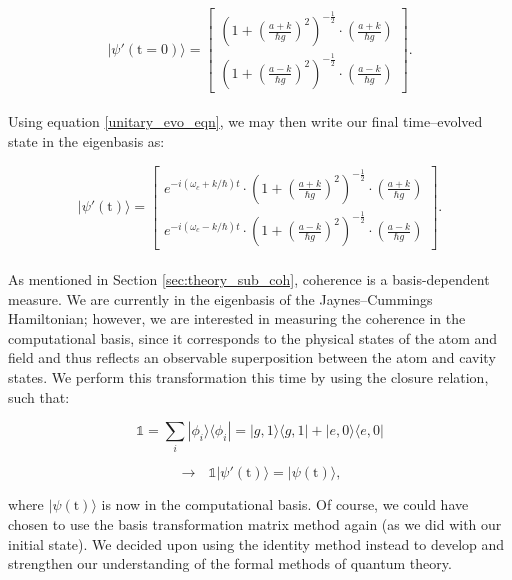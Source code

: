 \documentclass[11pt]{article}
\begin{document}
\begin{equation*}
    |\psi'(\text{t} = 0)\rangle = 
    \begin{bmatrix}
        \left(1 + \left(\frac{a + k}{\hbar g}\right)^2\right)^{-\frac{1}{2}}\cdot\left(\frac{a + k}{\hbar g}\right) \\
        \left(1 + \left(\frac{a - k}{\hbar g}\right)^2\right)^{-\frac{1}{2}}\cdot\left(\frac{a - k}{\hbar g}\right)
    \end{bmatrix}.
\end{equation*}
\\
Using equation \eqref{unitary_evo_eqn}, we may then write our final time--evolved state in the eigenbasis as:

\begin{equation*}
    |\psi'(\text{t})\rangle = 
    \begin{bmatrix}
        e^{-i(\omega_c + k/\hbar)t}\cdot\left(1 + \left(\frac{a + k}{\hbar g}\right)^2\right)^{-\frac{1}{2}}\cdot\left(\frac{a + k}{\hbar g}\right) \\
        e^{-i(\omega_c - k/\hbar)t}\cdot\left(1 + \left(\frac{a - k}{\hbar g}\right)^2\right)^{-\frac{1}{2}}\cdot\left(\frac{a - k}{\hbar g}\right)
    \end{bmatrix}.
\end{equation*}
\\
As mentioned in Section \ref{sec:theory_sub_coh}, coherence is a basis-dependent measure. We are currently in the eigenbasis of the Jaynes--Cummings Hamiltonian; however, we are interested in measuring the coherence in the computational basis, since it corresponds to the physical states of the atom and field and thus reflects an observable superposition between the atom and cavity states. We perform this transformation this time by using the closure relation, such that:

\begin{equation*}
    \mathds{1} = \sum_i|\phi_i\rangle\langle\phi_i| = |g,1\rangle\langle g,1| + |e,0\rangle\langle e,0|
\end{equation*}

\begin{equation*}
    \rightarrow \text{  } \mathds{1}|\psi'(\text{t})\rangle = |\psi(\text{t})\rangle,
\end{equation*}


where $|\psi(\text{t})\rangle$ is now in the computational basis. Of course, we could have chosen to use the basis transformation matrix method again (as we did with our initial state). We decided upon using the identity method instead to develop and strengthen our understanding of the formal methods of quantum theory. 
\end{document}
